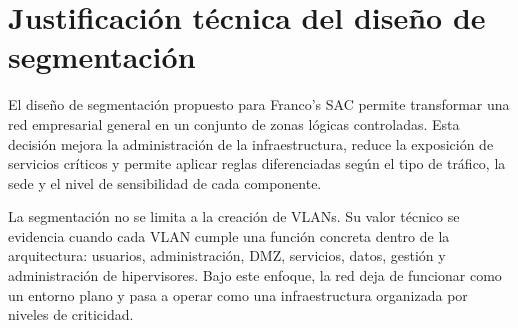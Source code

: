 \documentclass[11pt, a4paper, oneside]{report}
\begin{document}
\section{Justificación técnica del diseño de segmentación}

El diseño de segmentación propuesto para Franco's SAC permite transformar una red empresarial general en un conjunto de zonas lógicas controladas. Esta decisión mejora la administración de la infraestructura, reduce la exposición de servicios críticos y permite aplicar reglas diferenciadas según el tipo de tráfico, la sede y el nivel de sensibilidad de cada componente.

La segmentación no se limita a la creación de VLANs. Su valor técnico se evidencia cuando cada VLAN cumple una función concreta dentro de la arquitectura: usuarios, administración, DMZ, servicios, datos, gestión y administración de hipervisores. Bajo este enfoque, la red deja de funcionar como un entorno plano y pasa a operar como una infraestructura organizada por niveles de criticidad.

\renewcommand{\arraystretch}{1.3}
\footnotesize
{}
\end{document}
